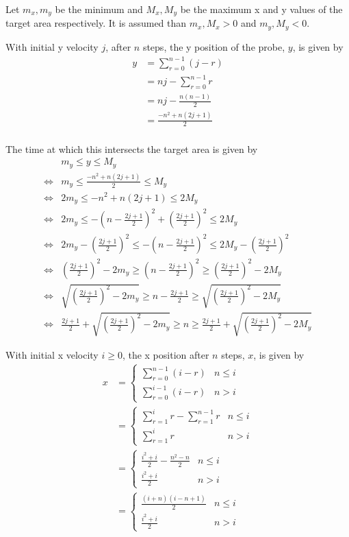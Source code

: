 \documentclass{article}
\begin{document}
Let \(m_x, m_y\) be the minimum and \(M_x, M_y\) be the maximum x and y values of the target area respectively.
It is assumed than \(m_x, M_x > 0\) and \(m_y, M_y < 0\).

With initial y velocity \(j\), after \(n\) steps, the y position of the probe, \(y\), is given by
\begin{align*}
  y &= \sum_{r=0}^{n-1}(j - r) \\
  &= nj - \sum_{r=0}^{n-1}{r} \\
  &= nj - \frac{n(n-1)}{2} \\
  &= \frac{-n^2 + n(2j + 1)}{2} \\
\end{align*}

The time at which this intersects the target area is given by
\begin{align*}
  & m_y \le y \le M_y \\
  \iff & m_y \le \frac{-n^2 + n(2j + 1)}{2} \le M_y \\
  \iff & 2m_y \le -n^2 + n(2j + 1) \le 2M_y \\
  \iff & 2m_y \le -(n - \frac{2j + 1}{2})^2 + (\frac{2j + 1}{2})^2 \le 2M_y \\
  \iff & 2m_y - (\frac{2j + 1}{2})^2 \le -(n - \frac{2j + 1}{2})^2 \le 2M_y - (\frac{2j + 1}{2})^2 \\
  \iff & (\frac{2j + 1}{2})^2 - 2m_y \ge (n - \frac{2j + 1}{2})^2 \ge (\frac{2j + 1}{2})^2 - 2M_y \\
  \iff & \sqrt{(\frac{2j + 1}{2})^2 - 2m_y} \ge n - \frac{2j + 1}{2} \ge \sqrt{(\frac{2j + 1}{2})^2 - 2M_y} \\
  \iff & \frac{2j + 1}{2} + \sqrt{(\frac{2j + 1}{2})^2 - 2m_y} \ge n \ge \frac{2j + 1}{2} + \sqrt{(\frac{2j + 1}{2})^2 - 2M_y}
\end{align*}

With initial x velocity \(i \ge 0\), the x position after \(n\) steps, \(x\), is given by
\begin{align*}
  x &=
  \begin{cases}
    \sum_{r=0}^{n-1}(i - r) & n \le i \\
    \sum_{r=0}^{i-1}(i - r) & n > i
  \end{cases} \\
  &=
  \begin{cases}
    \sum_{r=1}^{i}r - \sum_{r=1}^{n-1}{r} & n \le i \\
    \sum_{r=1}^{i}r & n > i
  \end{cases} \\
  &=
  \begin{cases}
    \frac{i^2 + i}{2} - \frac{n^2 - n}{2} & n \le i \\
    \frac{i^2 + i}{2} & n > i
  \end{cases} \\
  &=
  \begin{cases}
    \frac{(i+n)(i-n+1)}{2} & n \le i \\
    \frac{i^2 + i}{2} & n > i
  \end{cases}
\end{align*}
\end{document}
